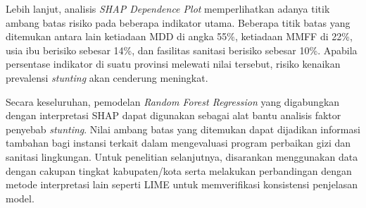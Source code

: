 Lebih lanjut, analisis \textit{SHAP Dependence Plot} memperlihatkan adanya titik ambang batas risiko pada beberapa indikator utama. Beberapa titik batas yang ditemukan antara lain ketiadaan MDD di angka 55\%, ketiadaan MMFF di 22\%, usia ibu berisiko sebesar 14\%, dan fasilitas sanitasi berisiko sebesar 10\%. Apabila persentase indikator di suatu provinsi melewati nilai tersebut, risiko kenaikan prevalensi \textit{stunting} akan cenderung meningkat.

Secara keseluruhan, pemodelan \textit{Random Forest Regression} yang digabungkan dengan interpretasi SHAP dapat digunakan sebagai alat bantu analisis faktor penyebab \textit{stunting}. Nilai ambang batas yang ditemukan dapat dijadikan informasi tambahan bagi instansi terkait dalam mengevaluasi program perbaikan gizi dan sanitasi lingkungan. Untuk penelitian selanjutnya, disarankan menggunakan data dengan cakupan tingkat kabupaten/kota serta melakukan perbandingan dengan metode interpretasi lain seperti LIME untuk memverifikasi konsistensi penjelasan model.

\vfill
\clearpage